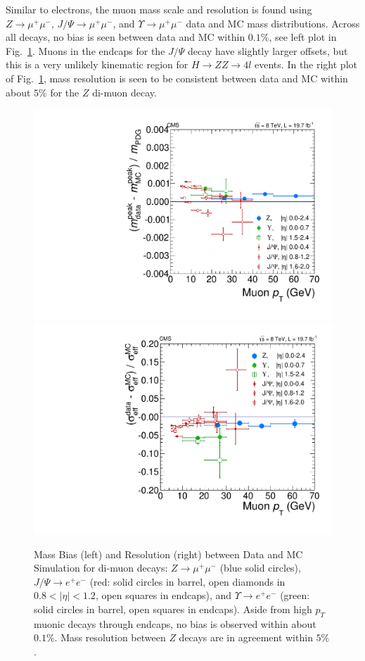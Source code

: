 Similar to electrons, the muon mass scale and resolution is found using $Z\rightarrow \mu^+\mu^-$, $J/\Psi \rightarrow \mu^+\mu^-$, and $\Upsilon \rightarrow \mu^+\mu^-$ data and MC mass distributions. Across all decays, no bias is seen between data and MC within $0.1\%$, see left plot in Fig.~\ref{fig:MuonMassResolutionandBias}. Muons in the endcaps for the $J/\Psi$ decay have slightly larger offsets, but this is a very unlikely kinematic region for $H\rightarrow ZZ \rightarrow 4l$ events. In the right plot of Fig.~\ref{fig:MuonMassResolutionandBias}, mass resolution is seen to be consistent between data and MC within about $5\%$ for the $Z$ di-muon decay.

\begin{figure}[htbp]
\begin{center}
\includegraphics[width=.45\linewidth]{HiggsDiscovery/figures/100_scale_mf.pdf}
\includegraphics[width=.45\linewidth]{HiggsDiscovery/figures/100_resolution_mf.pdf}
\caption[Mass Resolution and Bias from Di-muon Decays]{Mass Bias (left) and Resolution (right) between Data and MC Simulation for di-muon decays: $Z\rightarrow \mu^+\mu^-$ (blue solid circles), $J/\Psi\rightarrow e^+e^-$ (red: solid circles in barrel, open diamonds in $0.8<|\eta|<1.2$, open squares in endcaps), and $\Upsilon\rightarrow e^+e^-$ (green: solid circles in barrel, open squares in endcaps). Aside from high $p_T$ muonic decays through endcaps, no bias is observed within about $0.1\%$. Mass resolution between $Z$ decays are in agreement within $5\%$.}
\label{fig:MuonMassResolutionandBias}
\end{center}
\end{figure}

